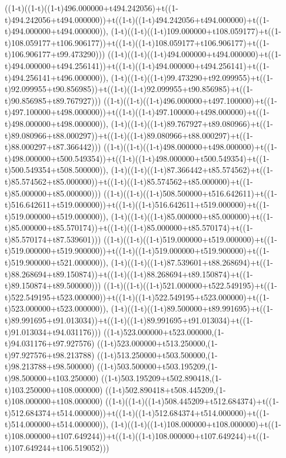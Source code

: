 ((1-t)((1-t)((1-t)496.000000+t494.242056)+t((1-t)494.242056+t494.000000))+t((1-t)((1-t)494.242056+t494.000000)+t((1-t)494.000000+t494.000000)),                                     (1-t)((1-t)((1-t)109.000000+t108.059177)+t((1-t)108.059177+t106.906177))+t((1-t)((1-t)108.059177+t106.906177)+t((1-t)106.906177+t99.473290)))
((1-t)((1-t)((1-t)494.000000+t494.000000)+t((1-t)494.000000+t494.256141))+t((1-t)((1-t)494.000000+t494.256141)+t((1-t)494.256141+t496.000000)),                                     (1-t)((1-t)((1-t)99.473290+t92.099955)+t((1-t)92.099955+t90.856985))+t((1-t)((1-t)92.099955+t90.856985)+t((1-t)90.856985+t89.767927)))
((1-t)((1-t)((1-t)496.000000+t497.100000)+t((1-t)497.100000+t498.000000))+t((1-t)((1-t)497.100000+t498.000000)+t((1-t)498.000000+t498.000000)),                                     (1-t)((1-t)((1-t)89.767927+t89.080966)+t((1-t)89.080966+t88.000297))+t((1-t)((1-t)89.080966+t88.000297)+t((1-t)88.000297+t87.366442)))
((1-t)((1-t)((1-t)498.000000+t498.000000)+t((1-t)498.000000+t500.549354))+t((1-t)((1-t)498.000000+t500.549354)+t((1-t)500.549354+t508.500000)),                                     (1-t)((1-t)((1-t)87.366442+t85.574562)+t((1-t)85.574562+t85.000000))+t((1-t)((1-t)85.574562+t85.000000)+t((1-t)85.000000+t85.000000)))
((1-t)((1-t)((1-t)508.500000+t516.642611)+t((1-t)516.642611+t519.000000))+t((1-t)((1-t)516.642611+t519.000000)+t((1-t)519.000000+t519.000000)),                                     (1-t)((1-t)((1-t)85.000000+t85.000000)+t((1-t)85.000000+t85.570174))+t((1-t)((1-t)85.000000+t85.570174)+t((1-t)85.570174+t87.539601)))
((1-t)((1-t)((1-t)519.000000+t519.000000)+t((1-t)519.000000+t519.900000))+t((1-t)((1-t)519.000000+t519.900000)+t((1-t)519.900000+t521.000000)),                                     (1-t)((1-t)((1-t)87.539601+t88.268694)+t((1-t)88.268694+t89.150874))+t((1-t)((1-t)88.268694+t89.150874)+t((1-t)89.150874+t89.500000)))
((1-t)((1-t)((1-t)521.000000+t522.549195)+t((1-t)522.549195+t523.000000))+t((1-t)((1-t)522.549195+t523.000000)+t((1-t)523.000000+t523.000000)),                                     (1-t)((1-t)((1-t)89.500000+t89.991695)+t((1-t)89.991695+t91.013034))+t((1-t)((1-t)89.991695+t91.013034)+t((1-t)91.013034+t94.031176)))
((1-t)523.000000+t523.000000,(1-t)94.031176+t97.927576)
((1-t)523.000000+t513.250000,(1-t)97.927576+t98.213788)
((1-t)513.250000+t503.500000,(1-t)98.213788+t98.500000)
((1-t)503.500000+t503.195209,(1-t)98.500000+t103.250000)
((1-t)503.195209+t502.890418,(1-t)103.250000+t108.000000)
((1-t)502.890418+t508.445209,(1-t)108.000000+t108.000000)
((1-t)((1-t)((1-t)508.445209+t512.684374)+t((1-t)512.684374+t514.000000))+t((1-t)((1-t)512.684374+t514.000000)+t((1-t)514.000000+t514.000000)),                                     (1-t)((1-t)((1-t)108.000000+t108.000000)+t((1-t)108.000000+t107.649244))+t((1-t)((1-t)108.000000+t107.649244)+t((1-t)107.649244+t106.519052)))
